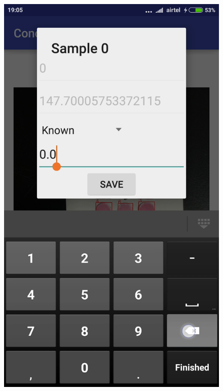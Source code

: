 \documentclass[runningheads,a4paper]{llncs}
\begin{document}
\begin{figure}[h!]
\begin{center}
\includegraphics[scale=0.11]{conc5}

\end{center}
\end{figure}
\end{document}
